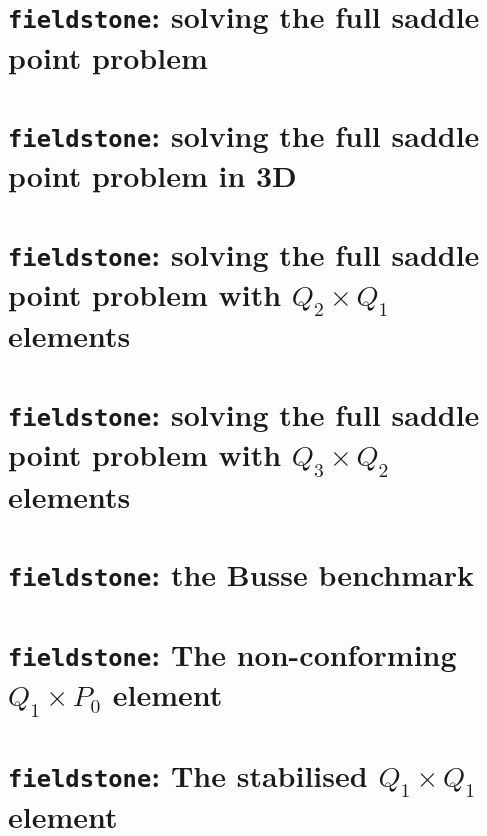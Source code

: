 \documentclass[a4paper]{article}
\begin{document}
\newpage
\section{{\tt fieldstone}: solving the full saddle point problem}


\newpage
\section{{\tt fieldstone}: solving the full saddle point problem in 3D}


\newpage
\section{{\tt fieldstone}: solving the full saddle point problem with $Q_2\times Q_1$ elements}


\newpage
\section{{\tt fieldstone}: solving the full saddle point problem with $Q_3\times Q_2$ elements}


\newpage
\section{{\tt fieldstone}: the Busse benchmark}



\newpage
\section{{\tt fieldstone}: The non-conforming $Q_1 \times P_0$ element} \label{ncq1p0} 


\newpage
\section{{\tt fieldstone}: The stabilised $Q_1 \times Q_1$ element} 

\end{document}

